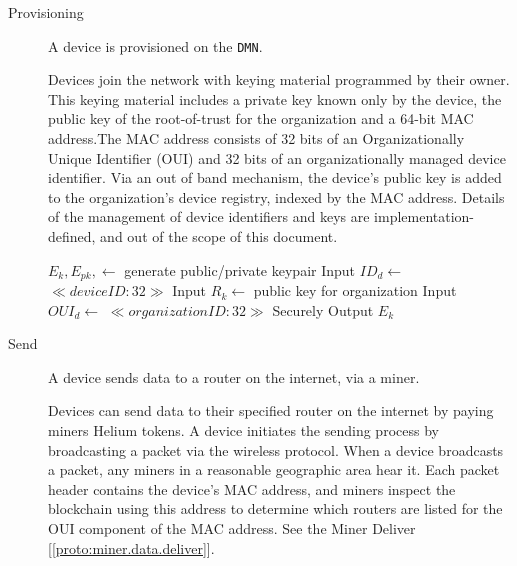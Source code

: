 \documentclass[UTF8, 10pt, nonatbib, nocopyrightspace, reprint]{sigplanconf}
\newenvironment{protocol}[2]{
  \begin{algorithm}[!htb]
    \DontPrintSemicolon
    \caption{#1}\label{#2}
}{
  \end{algorithm}
  \FloatBarrier
}
\newcommand{\protoref}[1]{[\autoref{#1}]}
\begin{document}
\begin{description}
  \item [Provisioning] A device is provisioned on the \verb|DMN|.

    Devices join the network with keying material programmed by their owner. This keying material includes a private key known only by the device, the public key of the root-of-trust for the organization and a 64-bit MAC address.The MAC address consists of 32 bits of an Organizationally Unique Identifier (OUI) and 32 bits of an organizationally managed device identifier. Via an out of band mechanism, the device's public key is added to the organization's device registry, indexed by the MAC address. Details of the management of device identifiers and keys are implementation-defined, and out of the scope of this document.

    \begin{protocol}{Device Provisioning}{proto:device.provision}

       {
        $E_k, E_{pk}, \leftarrow $ generate public/private keypair \;
        Input ${ID}_d \leftarrow $ $ \ll device ID:32 \gg $ \;
        Input $R_k \leftarrow $ public key for organization \;
        Input ${OUI}_d \leftarrow $ $ \ll organization ID:32 \gg $ \;
        \BlankLine
        Securely  \;
        \BlankLine
        Output $E_k$ \;
      }
    \end{protocol}


  \item [Send] A device sends data to a router on the internet, via a miner.

    Devices can send data to their specified router on the internet by paying miners Helium tokens.
    A device initiates the sending process by broadcasting a packet via the wireless protocol. When a device broadcasts a packet, any miners in a reasonable geographic area hear it. Each packet header contains the device's MAC address, and miners inspect the blockchain using this address to determine which routers are listed for the OUI component of the MAC address. See the Miner Deliver \protoref{proto:miner.data.deliver}.

    \begin{protocol}{Device Send Data}{proto:device.data.send}


\end{protocol}
\end{description}
\end{document}
